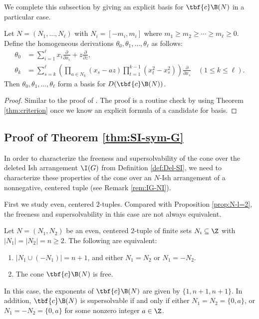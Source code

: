 We complete this subsection by giving an explicit basis for $\tbf{c}\B(N)$ in a particular case.
  \begin{theorem}
 \label{thm:basis}
 Let $N = (N_1, \ldots, N_\ell)$ with $N_i=[-m_i,m_i]$ where $ m_1 \ge m_2 \ge \cdots \ge m_\ell \ge 0$. 
 Define the homogeneous derivations $\theta_0, \theta_1,\ldots, \theta_\ell$ as follows:
  \begin{align*}
\theta_0  & =\sum_{i=1}^\ell x_i \frac{\partial}{\partial x_i} + z\frac{\partial}{\partial z},\\
\theta_k  & =\sum_{s=k}^\ell  \left( \prod_{a \in N_k}(x_s-az) \prod_{t=1}^{k-1}(x_t^2-x_s^2) \right)\frac{\partial}{\partial x_s} \quad (1 \le k \le \ell).
\end{align*}
Then $\theta_0, \theta_1,\ldots, \theta_\ell$ form a basis for  $D(\tbf{c}\B(N))$.
 \end{theorem} 
 \begin{proof}
 Similar to the proof of \cite[Theorem 1.4]{AST17}. 
 The proof is a routine check by using Theorem \ref{thm:criterion} once we know an explicit formula of a candidate for basis. 
 \end{proof} 
 
 
 
 
\subsection{Proof of Theorem  \ref{thm:SI-sym-G}}
\label{subsec:F-SS-G}

In order to characterize the freeness and supersolvability of the cone over the deleted Ish arrangement $\I(G)$ from Definition \ref{def:Del-SI}, we need to characterize these properties of the cone over an $N$-Ish arrangement of a nonnegative, centered tuple (see Remark \ref{rem:IG-NI}).


First we study even, centered $2$-tuples. 
Compared with Proposition \ref{prop:N-l=2}, the freeness and supersolvability in this case are not always equivalent. 
   \begin{proposition}
 \label{prop:N-l=2-relax}
 Let $N = (N_1, N_2)$ be  an even, centered $2$-tuple  of finite sets $N_i \subseteq \Z$ with $|N_1| = |N_2|=n \ge 2$.
 The following are equivalent:
 \begin{enumerate}[(1)]
 \item  $|N_1 \cup (-N_1)|=n+1$, and either  $N_1 =N_2$ or  $N_1=-N_2$. 
\item The cone $\tbf{c}\B(N)$  is  free.
\end{enumerate}
In this case, the exponents of  $\tbf{c}\B(N)$ are given by $\{1, n+1 , n+1\}$. 
In addition, $\tbf{c}\B(N)$ is supersolvable if and only if either $N_1 = N_2 =\{0,a\}$, or  $N_1 = -N_2 =\{0,a\}$ for some nonzero integer $a \in \Z$. 
\end{proposition}


